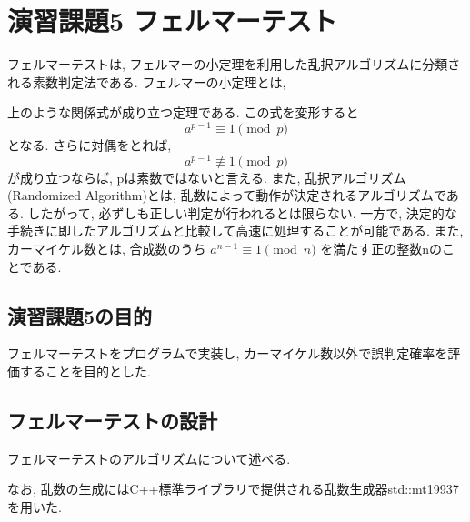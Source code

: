 \documentclass[xelatex, 11pt, a4paper, ja=standard]{bxjsarticle}
\begin{document}
\section{演習課題5 フェルマーテスト}
フェルマーテストは, フェルマーの小定理を利用した乱択アルゴリズムに分類される素数判定法である. 
フェルマーの小定理とは, 
\begin{center}
\end{center}
上のような関係式が成り立つ定理である. 
この式を変形すると 
\begin{equation*} a^{p-1} \equiv 1 \pmod{p} \end{equation*}
となる. 
さらに対偶をとれば, 
\begin{equation*} a^{p-1} \not \equiv 1 \pmod{p} \end{equation*}
が成り立つならば, pは素数ではないと言える. 
また, 乱択アルゴリズム(Randomized Algorithm)とは, 乱数によって動作が決定されるアルゴリズムである. 
したがって, 必ずしも正しい判定が行われるとは限らない. 
一方で, 決定的な手続きに即したアルゴリズムと比較して高速に処理することが可能である. 
また, カーマイケル数とは, 合成数のうち
$a^{n-1} \equiv 1 \pmod{n}$
を満たす正の整数nのことである. 


\subsection{演習課題5の目的}
フェルマーテストをプログラムで実装し, カーマイケル数以外で誤判定確率を評価することを目的とした. 

\subsection{フェルマーテストの設計}
フェルマーテストのアルゴリズムについて述べる. 
\begin{center}
\end{center}
なお, 乱数の生成にはC++標準ライブラリで提供される乱数生成器std::mt19937を用いた. 
\end{document}
